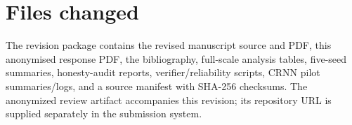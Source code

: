 \documentclass[11pt]{article}
\begin{document}
\section*{Files changed}
The revision package contains the revised manuscript source and PDF, this anonymised response PDF, the bibliography, full-scale analysis tables, five-seed summaries, honesty-audit reports, verifier/reliability scripts, CRNN pilot summaries/logs, and a source manifest with SHA-256 checksums. The anonymized review artifact accompanies this revision; its repository URL is supplied separately in the submission system.
\end{document}
